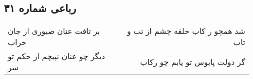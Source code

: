 \begin{center}
\section*{رباعی شماره ۳۱}
\label{sec:sh031}
\begin{longtable}{l p{0.5cm} r}
بر تافت عنان صبوری از جان خراب
&&
شد همچو ر کاب حلقه چشم از تب و تاب
\\
دیگر چو عنان نپیچم از حکم تو سر
&&
گر دولت پابوس تو یابم چو رکاب
\\
\end{longtable}
\end{center}
